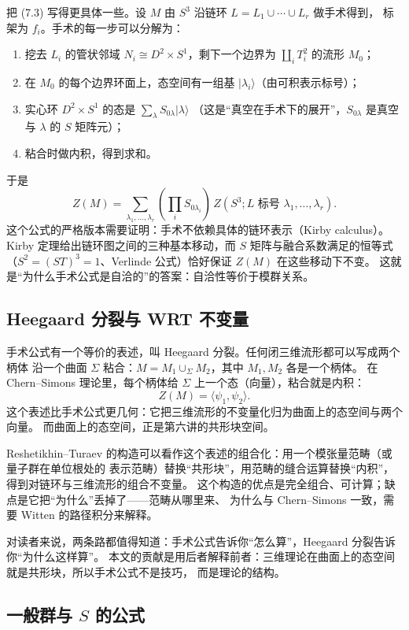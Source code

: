 把 (7.3) 写得更具体一些。设 $M$ 由 $S^3$ 沿链环 $L=L_1\cup\cdots\cup L_r$ 做手术得到，
标架为 $f_i$。手术的每一步可以分解为：
\begin{enumerate}[leftmargin=*]
  \item 挖去 $L_i$ 的管状邻域 $N_i\cong D^2\times S^1$，剩下一个边界为 $\coprod_i T^2_i$ 的流形 $M_0$；
  \item 在 $M_0$ 的每个边界环面上，态空间有一组基 $|\lambda_i\rangle$（由可积表示标号）；
  \item 实心环 $D^2\times S^1$ 的态是 $\sum_\lambda S_{0\lambda}|\lambda\rangle$
        （这是“真空在手术下的展开”，$S_{0\lambda}$ 是真空与 $\lambda$ 的 $S$ 矩阵元）；
  \item 粘合时做内积，得到求和。
\end{enumerate}
于是
\[
Z(M)=\sum_{\lambda_1,\dots,\lambda_r}
\left(\prod_i S_{0\lambda_i}\right)\,
Z(S^3;L\text{ 标号 }\lambda_1,\dots,\lambda_r).
\]
这个公式的严格版本需要证明：手术不依赖具体的链环表示（Kirby  calculus）。
Kirby 定理给出链环图之间的三种基本移动，而 $S$ 矩阵与融合系数满足的恒等式
（$S^2=(ST)^3=1$、Verlinde 公式）恰好保证 $Z(M)$ 在这些移动下不变。
这就是“为什么手术公式是自洽的”的答案：自洽性等价于模群关系。

\subsection{Heegaard 分裂与 WRT 不变量}

手术公式有一个等价的表述，叫 Heegaard 分裂。任何闭三维流形都可以写成两个柄体
沿一个曲面 $\Sigma$ 粘合：$M=M_1\cup_\Sigma M_2$，其中 $M_1,M_2$ 各是一个柄体。
在 Chern--Simons 理论里，每个柄体给 $\Sigma$ 上一个态（向量），粘合就是内积：
\[
Z(M)=\langle \psi_1,\psi_2\rangle .
\]
这个表述比手术公式更几何：它把三维流形的不变量化归为曲面上的态空间与两个向量。
而曲面上的态空间，正是第六讲的共形块空间。

Reshetikhin--Turaev 的构造可以看作这个表述的组合化：用一个模张量范畴（或量子群在单位根处的
表示范畴）替换“共形块”，用范畴的缝合运算替换“内积”，得到对链环与三维流形的组合不变量。
这个构造的优点是完全组合、可计算；缺点是它把“为什么”丢掉了——范畴从哪里来、
为什么与 Chern--Simons 一致，需要 Witten 的路径积分来解释。

对读者来说，两条路都值得知道：手术公式告诉你“怎么算”，Heegaard 分裂告诉你“为什么这样算”。
本文的贡献是用后者解释前者：三维理论在曲面上的态空间就是共形块，所以手术公式不是技巧，
而是理论的结构。

\subsection{一般群与 $S$ 的公式}

